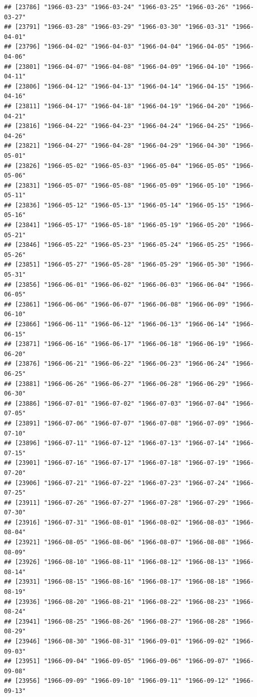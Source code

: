 \documentclass{article}\usepackage[]{graphicx}\usepackage[]{color}
\makeatletter
\newenvironment{kframe}{%
 \def\at@end@of@kframe{}%
 \ifinner\ifhmode%
  \def\at@end@of@kframe{\end{minipage}}%
  \begin{minipage}{\columnwidth}%
 \fi\fi%
 \def\FrameCommand##1{\hskip\@totalleftmargin \hskip-\fboxsep
 \colorbox{shadecolor}{##1}\hskip-\fboxsep
     \hskip-\linewidth \hskip-\@totalleftmargin \hskip\columnwidth}%
 \MakeFramed {\advance\hsize-\width
   \@totalleftmargin\z@ \linewidth\hsize
   \@setminipage}}%
 {\par\unskip\endMakeFramed%
 \at@end@of@kframe}
\newenvironment{knitrout}{}{} %
\makeatother
\begin{document}
\begin{description}
\begin{knitrout}
\begin{kframe}
\begin{verbatim}
## [23786] "1966-03-23" "1966-03-24" "1966-03-25" "1966-03-26" "1966-03-27"
## [23791] "1966-03-28" "1966-03-29" "1966-03-30" "1966-03-31" "1966-04-01"
## [23796] "1966-04-02" "1966-04-03" "1966-04-04" "1966-04-05" "1966-04-06"
## [23801] "1966-04-07" "1966-04-08" "1966-04-09" "1966-04-10" "1966-04-11"
## [23806] "1966-04-12" "1966-04-13" "1966-04-14" "1966-04-15" "1966-04-16"
## [23811] "1966-04-17" "1966-04-18" "1966-04-19" "1966-04-20" "1966-04-21"
## [23816] "1966-04-22" "1966-04-23" "1966-04-24" "1966-04-25" "1966-04-26"
## [23821] "1966-04-27" "1966-04-28" "1966-04-29" "1966-04-30" "1966-05-01"
## [23826] "1966-05-02" "1966-05-03" "1966-05-04" "1966-05-05" "1966-05-06"
## [23831] "1966-05-07" "1966-05-08" "1966-05-09" "1966-05-10" "1966-05-11"
## [23836] "1966-05-12" "1966-05-13" "1966-05-14" "1966-05-15" "1966-05-16"
## [23841] "1966-05-17" "1966-05-18" "1966-05-19" "1966-05-20" "1966-05-21"
## [23846] "1966-05-22" "1966-05-23" "1966-05-24" "1966-05-25" "1966-05-26"
## [23851] "1966-05-27" "1966-05-28" "1966-05-29" "1966-05-30" "1966-05-31"
## [23856] "1966-06-01" "1966-06-02" "1966-06-03" "1966-06-04" "1966-06-05"
## [23861] "1966-06-06" "1966-06-07" "1966-06-08" "1966-06-09" "1966-06-10"
## [23866] "1966-06-11" "1966-06-12" "1966-06-13" "1966-06-14" "1966-06-15"
## [23871] "1966-06-16" "1966-06-17" "1966-06-18" "1966-06-19" "1966-06-20"
## [23876] "1966-06-21" "1966-06-22" "1966-06-23" "1966-06-24" "1966-06-25"
## [23881] "1966-06-26" "1966-06-27" "1966-06-28" "1966-06-29" "1966-06-30"
## [23886] "1966-07-01" "1966-07-02" "1966-07-03" "1966-07-04" "1966-07-05"
## [23891] "1966-07-06" "1966-07-07" "1966-07-08" "1966-07-09" "1966-07-10"
## [23896] "1966-07-11" "1966-07-12" "1966-07-13" "1966-07-14" "1966-07-15"
## [23901] "1966-07-16" "1966-07-17" "1966-07-18" "1966-07-19" "1966-07-20"
## [23906] "1966-07-21" "1966-07-22" "1966-07-23" "1966-07-24" "1966-07-25"
## [23911] "1966-07-26" "1966-07-27" "1966-07-28" "1966-07-29" "1966-07-30"
## [23916] "1966-07-31" "1966-08-01" "1966-08-02" "1966-08-03" "1966-08-04"
## [23921] "1966-08-05" "1966-08-06" "1966-08-07" "1966-08-08" "1966-08-09"
## [23926] "1966-08-10" "1966-08-11" "1966-08-12" "1966-08-13" "1966-08-14"
## [23931] "1966-08-15" "1966-08-16" "1966-08-17" "1966-08-18" "1966-08-19"
## [23936] "1966-08-20" "1966-08-21" "1966-08-22" "1966-08-23" "1966-08-24"
## [23941] "1966-08-25" "1966-08-26" "1966-08-27" "1966-08-28" "1966-08-29"
## [23946] "1966-08-30" "1966-08-31" "1966-09-01" "1966-09-02" "1966-09-03"
## [23951] "1966-09-04" "1966-09-05" "1966-09-06" "1966-09-07" "1966-09-08"
## [23956] "1966-09-09" "1966-09-10" "1966-09-11" "1966-09-12" "1966-09-13"

\end{verbatim}
\end{kframe}
\end{knitrout}
\end{description}
\end{document}
